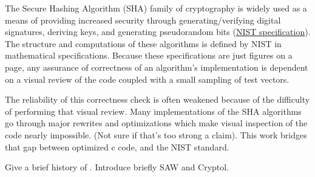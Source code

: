  
  
The Secure Hashing Algorithm (SHA) family of cryptography is widely used as a means of providing increased security through generating/verifying digital signatures, deriving keys, and generating pseudorandom bits (\href{https://csrc.nist.gov/publications/detail/fips/202/final}{NIST specification}).  
The structure and computations of these algorithms is defined by NIST in mathematical specifications.  
Because these specifications are just figures on a page, any assurance of correctness of an algorithm’s implementation is dependent on a visual review of the code coupled with a small sampling of test vectors.

The reliability of this correctness check is often weakened because of the difficulty of performing that visual review.  
Many implementations of the SHA algorithms go through major rewrites and optimizations which make visual inspection of the code nearly impossible. (Not sure if that’s too strong a claim).
This work bridges that gap between optimized c code, and the NIST standard.

Give a brief history of \shaThree. Introduce briefly SAW and Cryptol.






